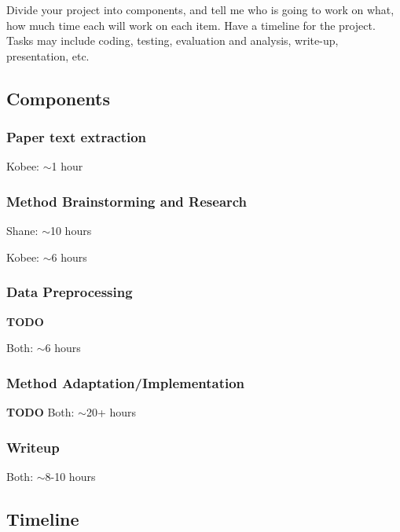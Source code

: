 \documentclass[conference]{sig-alternate-05-2015}
\begin{document}
Divide your project into components, and tell me who is going to work on what, how much time each will work on each item. Have a timeline for the project. Tasks may include coding, testing, evaluation and analysis, write-up, presentation, etc. 

\subsection{Components}

\subsubsection{Paper text extraction}

Kobee: $\sim$1 hour

\subsubsection{Method Brainstorming and Research}

Shane: $\sim$10 hours

Kobee: $\sim$6 hours

\subsubsection{Data Preprocessing}

\textbf{TODO}

Both: $\sim$6 hours

\subsubsection{Method Adaptation/Implementation}

\textbf{TODO}
Both: $\sim$20+ hours

\subsubsection{Writeup}

Both: $\sim$8-10 hours

\subsection{Timeline}
\end{document}
